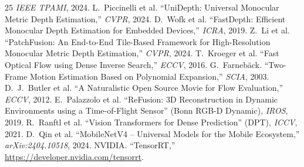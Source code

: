 \documentclass[10pt,twocolumn]{article}
\begin{document}
\begin{thebibliography}{25}
\emph{IEEE TPAMI}, 2024.
 L.~Piccinelli et al. ``UniDepth: Universal Monocular
Metric Depth Estimation,'' \emph{CVPR}, 2024.
 D.~Wofk et al. ``FastDepth: Efficient Monocular Depth
Estimation for Embedded Devices,'' \emph{ICRA}, 2019.
 Z.~Li et al. ``PatchFusion: An End-to-End Tile-Based
Framework for High-Resolution Monocular Metric Depth Estimation,''
\emph{CVPR}, 2024.
 T.~Kroeger et al. ``Fast Optical Flow using Dense Inverse
Search,'' \emph{ECCV}, 2016.
 G.~Farneb\"ack. ``Two-Frame Motion Estimation Based on
Polynomial Expansion,'' \emph{SCIA}, 2003.
 D.~J.~Butler et al. ``A Naturalistic Open Source Movie for
Flow Evaluation,'' \emph{ECCV}, 2012.
 E.~Palazzolo et al. ``ReFusion: 3D Reconstruction in Dynamic
Environments using a Time-of-Flight Sensor'' (Bonn RGB-D Dynamic), \emph{IROS},
2019.
 R.~Ranftl et al. ``Vision Transformers for Dense Prediction''
(DPT), \emph{ICCV}, 2021.
 D.~Qin et al. ``MobileNetV4 -- Universal Models for the
Mobile Ecosystem,'' \emph{arXiv:2404.10518}, 2024.
 NVIDIA. ``TensorRT,'' \url{https://developer.nvidia.com/tensorrt}.
\end{thebibliography}
\end{document}
